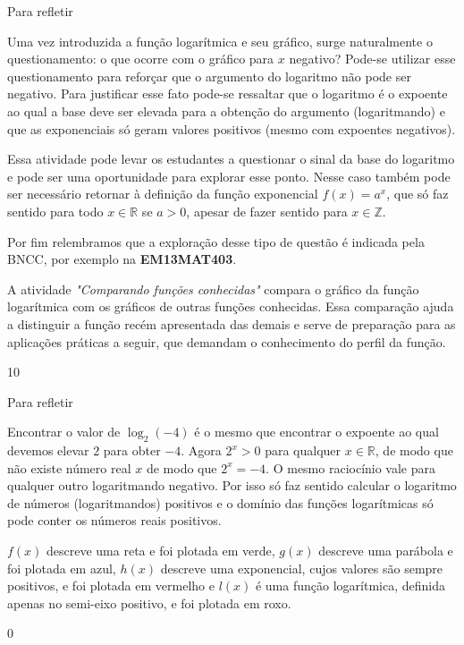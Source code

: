 \begin{sugestions}{Para refletir}
{
	Uma vez introduzida a função logarítmica e seu gráfico, surge naturalmente o questionamento: o que ocorre com o gráfico para $x$ negativo? Pode-se utilizar esse questionamento para reforçar que o argumento do logaritmo não pode ser negativo. Para justificar esse fato pode-se ressaltar que o logaritmo é o expoente ao qual a base deve ser elevada para a obtenção do argumento (logaritmando) e que as exponenciais só geram valores positivos (mesmo com expoentes negativos).

	Essa atividade pode levar os estudantes a questionar o sinal da base do logaritmo e pode ser uma oportunidade para explorar esse ponto. Nesse caso também pode ser necessário retornar à definição da função exponencial $f(x)=a^x$, que só faz sentido para todo $x \in \mathbb{R}$ se $a>0$, apesar de fazer sentido para $x \in \mathbb{Z}$.

	Por fim relembramos que a exploração desse tipo de questão é indicada pela BNCC, por exemplo na \textbf{EM13MAT403}.


	A atividade \textit{"Comparando funções conhecidas"} compara o gráfico da função logarítmica com os gráficos de outras funções conhecidas. Essa comparação ajuda a distinguir a função recém apresentada das demais e serve de preparação para as aplicações práticas a seguir, que demandam o conhecimento do perfil da função.
}{1}{0}
\end{sugestions}
\begin{answer}{Para refletir}
{
	Encontrar o valor de $\log_2 (-4)$ é o mesmo que encontrar o expoente ao qual devemos elevar $2$ para obter $-4$. Agora $2^x>0$ para qualquer $x \in \mathbb{R}$, de modo que não existe número real $x$ de modo que $2^x=-4$. O mesmo raciocínio vale para qualquer outro logaritmando negativo. Por isso só faz sentido calcular o logaritmo de números (logaritmandos) positivos e o domínio das funções logarítmicas só pode conter os números reais positivos.


	$f(x)$ descreve uma reta e foi plotada em verde, $g(x)$ descreve uma parábola e foi plotada em azul, $h(x)$ descreve uma exponencial, cujos valores são sempre positivos, e foi plotada em vermelho e $l(x)$ é uma função logarítmica, definida apenas no semi-eixo positivo, e foi plotada em roxo.
}{0}
\end{answer}

